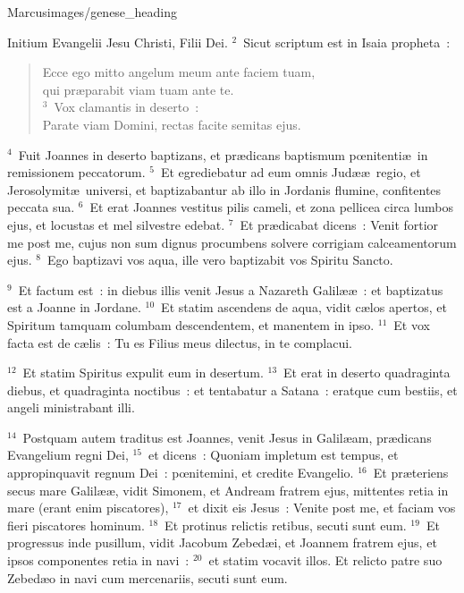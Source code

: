 {Marcus}{images/genese_heading}


\lettrine[lines=6,image=true,loversize=0.05,lraise=-0.03]{I}{}nitium Evangelii Jesu Christi, Filii Dei.
${}^{2}$~Sicut scriptum est in Isaia propheta~: \begin{flushleft}\begin{verse}Ecce ego mitto angelum meum ante faciem tuam,\\ qui pr\ae parabit viam tuam ante te.\\
${}^{3}$~Vox clamantis in deserto~:\\ Parate viam Domini, rectas facite semitas ejus.\end{verse}\end{flushleft}


${}^{4}$~Fuit Joannes in deserto baptizans, et pr\ae dicans baptismum pœnitenti\ae\ in remissionem peccatorum.
${}^{5}$~Et egrediebatur ad eum omnis Jud\ae \ae\ regio, et Jerosolymit\ae\ universi, et baptizabantur ab illo in Jordanis flumine, confitentes peccata sua.
${}^{6}$~Et erat Joannes vestitus pilis cameli, et zona pellicea circa lumbos ejus, et locustas et mel silvestre edebat.
${}^{7}$~Et pr\ae dicabat dicens~: Venit fortior me post me, cujus non sum dignus procumbens solvere corrigiam calceamentorum ejus.
${}^{8}$~Ego baptizavi vos aqua, ille vero baptizabit vos Spiritu Sancto.


${}^{9}$~Et factum est~: in diebus illis venit Jesus a Nazareth Galil\ae \ae~: et baptizatus est a Joanne in Jordane.
${}^{10}$~Et statim ascendens de aqua, vidit c\ae los apertos, et Spiritum tamquam columbam descendentem, et manentem in ipso.
${}^{11}$~Et vox facta est de c\ae lis~: Tu es Filius meus dilectus, in te complacui.


${}^{12}$~Et statim Spiritus expulit eum in desertum.
${}^{13}$~Et erat in deserto quadraginta diebus, et quadraginta noctibus~: et tentabatur a Satana~: eratque cum bestiis, et angeli ministrabant illi.


${}^{14}$~Postquam autem traditus est Joannes, venit Jesus in Galil\ae am, pr\ae dicans Evangelium regni Dei,
${}^{15}$~et dicens~: Quoniam impletum est tempus, et appropinquavit regnum Dei~: pœnitemini, et credite Evangelio.
${}^{16}$~Et pr\ae teriens secus mare Galil\ae \ae , vidit Simonem, et Andream fratrem ejus, mittentes retia in mare (erant enim piscatores),
${}^{17}$~et dixit eis Jesus~: Venite post me, et faciam vos fieri piscatores hominum.
${}^{18}$~Et protinus relictis retibus, secuti sunt eum.
${}^{19}$~Et progressus inde pusillum, vidit Jacobum Zebed\ae i, et Joannem fratrem ejus, et ipsos componentes retia in navi~:
${}^{20}$~et statim vocavit illos. Et relicto patre suo Zebed\ae o in navi cum mercenariis, secuti sunt eum.


